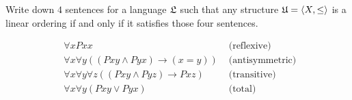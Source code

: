 \begin{problem}[7]
  Write down $4$ sentences for a language $\mathfrak{L}$ such that
  any structure $\mathfrak{U} = \langle X, \le \rangle$
  is a linear ordering if and only if it satisfies those four sentences.

  \begin{Answer}
    \begin{align*}
      &\forall x Pxx &\text{ (reflexive) }\\
      &\forall x \forall y \left( (Pxy \land Pyx) \to (x = y) \right) &\text{ (antisymmetric) }\\
      &\forall x \forall y \forall z \left( (Pxy \land Pyz) \to Pxz \right) &\text{ (transitive) } \\
      &\forall x \forall y \left( Pxy \lor Pyx \right) &\text{ (total) }\\
    \end{align*}
  \end{Answer}
\end{problem}

